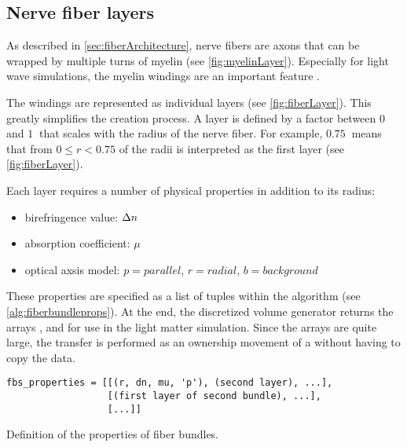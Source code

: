 \subsection{Nerve fiber layers}
%
As described in \cref{sec:fiberArchitecture}, nerve fibers are axons that can be wrapped by multiple turns of myelin (see \cref{fig:myelinLayer}).
Especially for light wave simulations, the myelin windings are an important feature \cite{MenzelDissertation}.
\par
%
The windings are represented as individual layers (see \cref{fig:fiberLayer}).
This greatly simplifies the creation process.
A layer is defined by a factor between $\SI{0}{}$ and $\SI{1}{}$ that scales with the radius of the nerve fiber.
For example, $\SI{0.75}{}$ means that from $0 \leq r < 0.75$ of the radii is interpreted as the first layer (see \cref{fig:fiberLayer}).
\par
%
Each layer requires a number of physical properties in addition to its radius:
%
\begin{itemize}[nosep]
    \item birefringence value: $\textnormal{$\Delta n$}$
    \item absorption coefficient: $\mu$
    \item optical axsis model: $p=\mathit{parallel}$, $r=\mathit{radial}$, $b=\mathit{background}$
\end{itemize}
%
These properties are specified as a list of tuples within the algorithm (see \cref{alg:fiberbundleprops}).
%
%
At the end, the discretized volume generator returns the arrays \tissue{}, \opticalaxis{} and \propertylist{} for use in the light matter simulation.
Since the arrays are quite large, the transfer is performed as an ownership movement of a  without having to copy the data.
% 
\begin{lstfloat}[!ht]
\lstset{style=python}
\begin{lstlisting}[]
fbs_properties = [[(r, dn, mu, 'p'), (second layer), ...],
                  [(first layer of second bundle), ...],
                  [...]]
\end{lstlisting}
\caption{Definition of the properties of fiber bundles.}
\label{alg:fiberbundleprops}
\end{lstfloat}
% 
% 
% 
